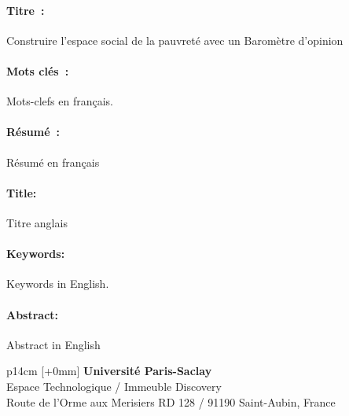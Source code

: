 \documentclass[12pt,a4paper]{reedthesis}
\begin{document}
\noindent
\begin{mdframed}[linecolor=Prune,linewidth=1]
\vspace{-.25cm}
\paragraph*{Titre~:} Construire l'espace social de la pauvreté avec un Baromètre d'opinion
\begin{small}
\vspace{-.25cm}
\paragraph*{Mots clés~:} Mots-clefs en français.

\vspace{-.5cm}
\begin{multicols}{2}
\paragraph*{Résumé~:} Résumé en français
\end{multicols}
\end{small}
\end{mdframed}
\begin{mdframed}[linecolor=Prune,linewidth=1]
\vspace{-.25cm}
\paragraph*{Title:} Titre anglais
\begin{small}
\vspace{-.25cm}
\paragraph*{Keywords:} Keywords in English.

\vspace{-.5cm}
\begin{multicols}{2}
\paragraph*{Abstract:} Abstract in English
\end{multicols}
\end{small}
\end{mdframed}

\vfill
{}\selectfont
\noindent\begin{tabular}{p{14cm}}
[+0mm]{\small {\color{Prune} {\bf Université Paris-Saclay}\\
{\scriptsize Espace Technologique / Immeuble Discovery}\\
{\scriptsize  Route de l’Orme aux Merisiers RD 128 / 91190 Saint-Aubin, France}}}\\\mbox{}
\end{tabular}

\end{document}
